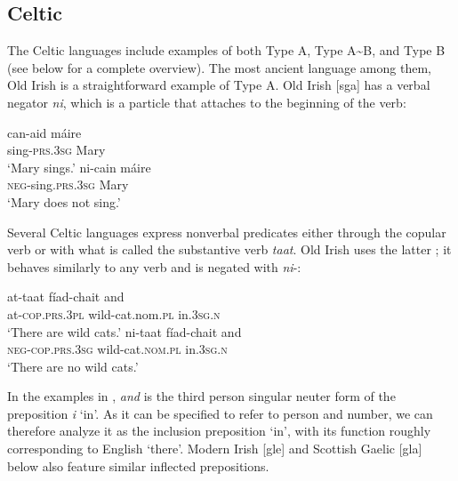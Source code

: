 \documentclass[output=paper]{langsci/langscibook}
\begin{document}
\subsection{Celtic}\label{sec:ieur-4.6}

The Celtic languages include examples of both Type A, Type
A{\textasciitilde}B, and Type B (see  below
for a complete overview). The most ancient language among them, Old
Irish is a straightforward example of Type A. Old Irish [sga] has a verbal negator \textit{ni}, which is a particle that attaches to the beginning of the verb: 
%
\begin{exe}\ex\label{ex:ieur-oldirish-sing}
\begin{xlist}
\ex\gll can-aid máire \\
sing-\textsc{prs.3sg} Mary \\
    \glt `Mary sings.'
\ex\gll ni-cain máire\\
\textsc{neg}-sing.\textsc{prs.3sg} Mary\\
\glt `Mary does not sing.'
\end{xlist}\end{exe}
%
Several Celtic languages express nonverbal predicates either through the
copular verb or with what is called the substantive verb \textit{taat}. Old Irish uses
the latter \parencite[39ff]{McCone2005}; it behaves similarly to any verb and is negated with \textit{ni}-:
%
\begin{exe}\ex\label{ex:ieur-oldirish-wildcats}
\begin{xlist}
\ex\gll at-taat fíad-chait and \\
at-\textsc{cop}.\textsc{prs}.\textsc{3pl}    wild-cat.nom.\textsc{pl} in.\textsc{3sg.n} \\
    \glt `There are wild cats.'
\ex\gll ni-taat fíad-chait and\\
\textsc{neg}-\textsc{cop}.\textsc{prs}.\textsc{3sg}
wild-cat.\textsc{nom}.\textsc{pl} in.\textsc{3sg.n}\\
\glt `There are no wild cats.'
\end{xlist}\end{exe}
%
In the examples in , \textit{and} is the
third person singular neuter form of the preposition \textit{i} `in'. As it
can be specified to refer to person and number, we can therefore analyze it
as the inclusion preposition `in', with its function roughly corresponding
to English `there'. Modern Irish [gle] and Scottish
Gaelic [gla] below also feature similar inflected prepositions.
\end{document}

